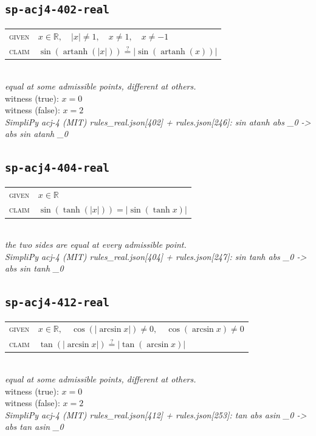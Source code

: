 \documentclass[11pt]{article}
\begin{document}
\subsection*{\texttt{sp-acj4-402-real}}
\begin{tabular}{@{}l@{\quad}l@{}}
\textsc{given} & $x \in \mathbb{R},\quad \left|x\right| \neq 1,\quad x \neq 1,\quad x \neq -1$ \\[4pt]
\textsc{claim} & $\displaystyle \sin\left(\operatorname{artanh}\left(\left|x\right|\right)\right) \overset{?}{=} \left|\sin\left(\operatorname{artanh}\left(x\right)\right)\right|$ \\
\end{tabular}\\[2pt]
{\small\emph{equal at some admissible points, different at others.}}\\
{\footnotesize\color{gray}witness (true): $x = 0$}\\
{\footnotesize\color{gray}witness (false): $x = 2$}\\
\emph{SimpliPy acj-4 (MIT) rules\_real.json[402] + rules.json[246]: sin atanh abs \_0  ->  abs sin atanh \_0}\\

\subsection*{\texttt{sp-acj4-404-real}}
\begin{tabular}{@{}l@{\quad}l@{}}
\textsc{given} & $x \in \mathbb{R}$ \\[4pt]
\textsc{claim} & $\displaystyle \sin\left(\tanh\left(\left|x\right|\right)\right) = \left|\sin\left(\tanh x\right)\right|$ \\
\end{tabular}\\[2pt]
{\small\emph{the two sides are equal at every admissible point.}}\\
\emph{SimpliPy acj-4 (MIT) rules\_real.json[404] + rules.json[247]: sin tanh abs \_0  ->  abs sin tanh \_0}\\

\subsection*{\texttt{sp-acj4-412-real}}
\begin{tabular}{@{}l@{\quad}l@{}}
\textsc{given} & $x \in \mathbb{R},\quad \cos\left(\left|\arcsin x\right|\right) \neq 0,\quad \cos\left(\arcsin x\right) \neq 0$ \\[4pt]
\textsc{claim} & $\displaystyle \tan\left(\left|\arcsin x\right|\right) \overset{?}{=} \left|\tan\left(\arcsin x\right)\right|$ \\
\end{tabular}\\[2pt]
{\small\emph{equal at some admissible points, different at others.}}\\
{\footnotesize\color{gray}witness (true): $x = 0$}\\
{\footnotesize\color{gray}witness (false): $x = 2$}\\
\emph{SimpliPy acj-4 (MIT) rules\_real.json[412] + rules.json[253]: tan abs asin \_0  ->  abs tan asin \_0}\\
\end{document}
